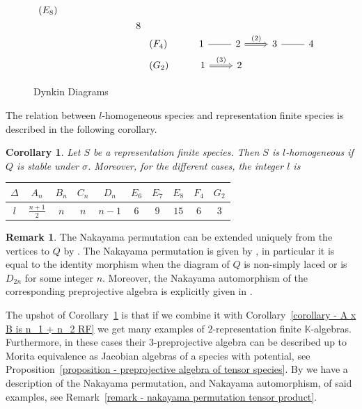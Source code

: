 \documentclass[a4paper, reqno]{amsart}
\newtheorem{mycor}[mythm]{Corollary}
\theoremstyle{definition}
\newtheorem{myrem}[mythm]{Remark}
\newcommand{\K}{\mathbb{K}}
\begin{document}
\begin{figure}[ht]
\begin{equation*}
\begin{aligned}
\begin{tikzcd}[row sep=0em]
		(E_8) \\
		& & & 8 \\
		\end{tikzcd} \\[-0.3em]
		&\begin{tikzcd}
		(F_4) & 1 \arrow[r, -] & 2 \arrow["(2)", r, Rightarrow] & 3 \arrow[r, -] & 4 \\
		\end{tikzcd} \\[-2em]
		&\begin{tikzcd}
		(G_2) & 1 \arrow["(3)", r, Rightarrow] & 2
		\end{tikzcd}
		\end{aligned}
	\end{equation*}
	\caption{Dynkin Diagrams}\label{Figure - Dynkin Diagrams 1}
\end{figure}

The relation between $l$-homogeneous species and representation finite species is described in the following corollary. 

\begin{mycor}\label{Corollary - l homogeneous species}\cite[Corollary 3.7]{soderberg2022preprojective}
	Let $S$ be a representation finite species. Then $S$ is $l$-homogeneous if $Q$ is stable under $\sigma$. Moreover, for the different cases, the integer $l$ is
	\begin{center}
		\begin{tabular}{c|c|c|c|c|c|c|c|c|c}
			$\Delta$ & $A_n$ & $B_n$ & $C_n$ & $D_n$ & $E_6$ & $E_7$ & $E_8$ & $F_4$ & $G_2$ \\\hline
			$l$ & $\frac{n+1}{2}$ & $n$ & $n$ & $n-1$ & $6$ & $9$ & $15$ & $6$ & $3$
		\end{tabular}
	\end{center}
\end{mycor}

\begin{myrem}
	The Nakayama permutation can be extended uniquely from the vertices to $Q$ by \cite[Lemma 3.3]{soderberg2022preprojective}. The Nakayama permutation is given by \cite[Theorem 3.1]{soderberg2022preprojective}, in particular it is equal to the identity morphism when the diagram of $Q$ is non-simply laced or is $D_{2n}$ for some integer $n$. Moreover, the Nakayama automorphism of the corresponding preprojective algebra is explicitly given in \cite[Theorem 5.3]{soderberg2022preprojective}.
\end{myrem}

The upshot of Corollary~\ref{Corollary - l homogeneous species} is that if we combine it with Corollary~\ref{corollary - A x B is n_1 + n_2 RF} we get many examples of $2$-representation finite $\K$-algebras. Furthermore, in these cases their $3$-preprojective algebra can be described up to Morita equivalence as Jacobian algebras of a species with potential, see Proposition~\ref{proposition - preprojective algebra of tensor species}. By \cite[Proposition 10.11]{soderberg2022preprojective} we have a description of the Nakayama permutation, and Nakayama automorphism, of said examples, see Remark~\ref{remark - nakayama permutation tensor product}.
\end{document}
